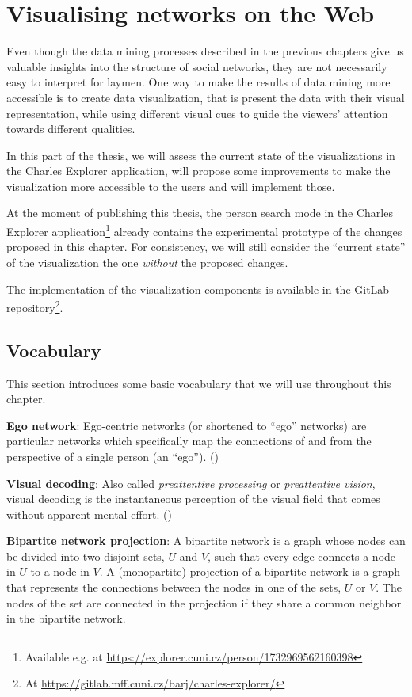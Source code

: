 \chapter{Visualising networks on the Web}

Even though the data mining processes described in the previous chapters give us valuable insights into the structure of social networks, 
they are not necessarily easy to interpret for laymen.
One way to make the results of data mining more accessible is to create data visualization, that is present the data with their visual representation, 
while using different visual cues to guide the viewers' attention towards different qualities.

In this part of the thesis, we will assess the current state of the visualizations in the Charles Explorer application, 
will propose some improvements to make the visualization more accessible to the users and will implement those.

At the moment of publishing this thesis, the person search mode in the Charles Explorer application\footnote{Available e.g. at \url{https://explorer.cuni.cz/person/1732969562160398}} already contains the experimental prototype of the changes proposed in this chapter.
For consistency, we will still consider the ``current state'' of the visualization the one \textit{without} the proposed changes.

The implementation of the visualization components is available in the GitLab repository\footnote{At \url{https://gitlab.mff.cuni.cz/barj/charles-explorer/}}.

\section{Vocabulary}

This section introduces some basic vocabulary that we will use throughout this chapter.

\textbf{Ego network}: Ego-centric networks (or shortened to “ego” networks) are particular networks which specifically map the connections of and from the perspective of a single person (an “ego”). (\cite{Lizardo2020-xo})

\textbf{Visual decoding}: Also called \textit{preattentive processing} or \textit{preattentive vision}, visual decoding is the instantaneous perception of the visual field that comes without apparent mental effort. (\cite{Cleveland1985})

\textbf{Bipartite network projection}: A bipartite network is a graph whose nodes can be divided into two disjoint sets, $U$ and $V$, such that every edge connects a node in $U$ to a node in $V$.
A (monopartite) projection of a bipartite network is a graph that represents the connections between the nodes in one of the sets, $U$ or $V$.
The nodes of the set are connected in the projection if they share a common neighbor in the bipartite network.


